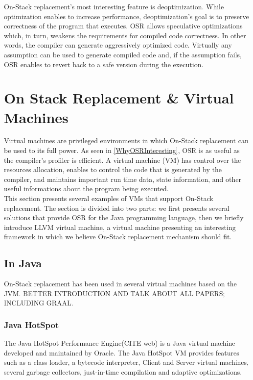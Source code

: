 On-Stack replacement's most interesting feature is deoptimization. 
While optimization enables to increase performance, deoptimization's goal is to preserve correctness of the program that executes.
OSR allows speculative optimizations which, in turn, weakens the requirements for compiled code correctness. 
In other words, the compiler can generate aggressively optimized code. 
Virtually any assumption can be used to generate compiled code and, if the assumption fails, 
OSR enables to revert back to a safe version during the execution.\\

\section{On Stack Replacement \& Virtual Machines}
Virtual machines are privileged environments in which On-Stack replacement can be used to its full power.
As seen in \ref{WhyOSRInteresting}, OSR is as useful as the compiler's profiler is efficient.
A virtual machine (VM) has control over the resources allocation, enables to control the code that is generated by the compiler, and maintains important run time data, state information, and other useful informations about the program being executed.\\

This section presents several examples of VMs that support On-Stack replacement. 
The section is divided into two parts: we first presents several solutions that provide OSR for  the Java programming language, then we briefly introduce LLVM virtual machine, a virtual machine presenting an interesting framework in which we believe On-Stack replacement mechanism should fit.\\ 
\subsection{In Java}
On-Stack replacement has been used in several virtual machines based on the JVM.
BETTER INTRODUCTION AND TALK ABOUT ALL PAPERS; INCLUDING GRAAL.\\

\subsubsection{Java HotSpot}
The Java HotSpot Performance Engine(CITE web) is a Java virtual machine developed and maintained by Oracle.
The Java HotSpot VM provides features such as a class loader, a bytecode interpreter, Client and Server virtual machines, several garbage collectors, just-in-time compilation and adaptive optimizations.\\

